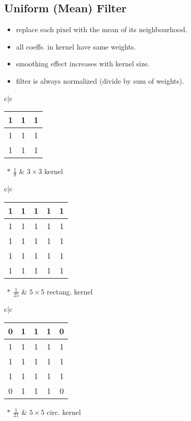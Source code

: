 \subsection{Uniform (Mean) Filter}
\begin{itemize}
  \item replace each pixel with the mean of its neighbourhood.
  \item all coeffs. in kernel have same weights.
  \item smoothing effect increases with kernel size.
  \item filter is always normalized (divide by sum of weights).
\end{itemize}
\begin{tabular}{c|c}
  \begin{tabular}{|c|c|c|}
  \hline
  1 & 1 & 1\\
  \hline
  1 & 1 & 1\\
  \hline
  1 & 1 & 1\\
  \hline
  \end{tabular}$\ *\ \frac{1}{9}$
  &  $3 \times 3$ kernel
\end{tabular}

\begin{tabular}{c|c}
  \begin{tabular}{|c|c|c|c|c|}
  \hline
  1 & 1 & 1 & 1 & 1\\
  \hline
  1 & 1 & 1 & 1 & 1\\
  \hline
  1 & 1 & 1 & 1 & 1\\
  \hline
  1 & 1 & 1 & 1 & 1\\
  \hline
  1 & 1 & 1 & 1 & 1\\
  \hline
  \end{tabular}$\ *\ \frac{1}{25}$
  &  $5 \times 5$ rectang. kernel
\end{tabular}

\begin{tabular}{c|c}
  \begin{tabular}{|c|c|c|c|c|}
  \hline
  0 & 1 & 1 & 1 & 0\\
  \hline
  1 & 1 & 1 & 1 & 1\\
  \hline
  1 & 1 & 1 & 1 & 1\\
  \hline
  1 & 1 & 1 & 1 & 1\\
  \hline
  0 & 1 & 1 & 1 & 0\\
  \hline
  \end{tabular}$\ *\ \frac{1}{21}$
  &  $5 \times 5$ circ. kernel
\end{tabular}

